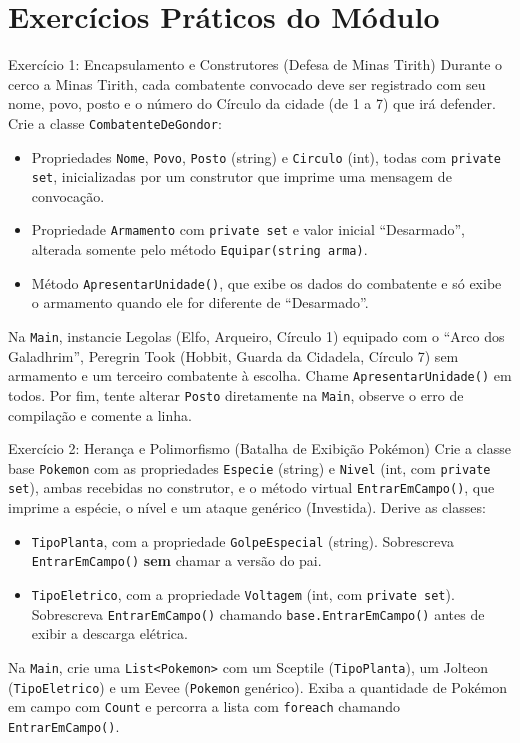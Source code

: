 \section{Exercícios Práticos do Módulo}

\begin{exercicio}{Exercício 1: Encapsulamento e Construtores (Defesa de Minas Tirith)}
Durante o cerco a Minas Tirith, cada combatente convocado deve ser registrado com seu nome,
povo, posto e o número do Círculo da cidade (de 1 a 7) que irá defender. Crie a classe
\texttt{CombatenteDeGondor}:
\begin{itemize}
    \item Propriedades \texttt{Nome}, \texttt{Povo}, \texttt{Posto} (string) e
    \texttt{Circulo} (int), todas com \texttt{private set}, inicializadas por um construtor
    que imprime uma mensagem de convocação.
    \item Propriedade \texttt{Armamento} com \texttt{private set} e valor inicial
    ``Desarmado'', alterada somente pelo método \texttt{Equipar(string arma)}.
    \item Método \texttt{ApresentarUnidade()}, que exibe os dados do combatente e só exibe o
    armamento quando ele for diferente de ``Desarmado''.
\end{itemize}
Na \texttt{Main}, instancie Legolas (Elfo, Arqueiro, Círculo 1) equipado com o ``Arco dos
Galadhrim'', Peregrin Took (Hobbit, Guarda da Cidadela, Círculo 7) sem armamento e um terceiro
combatente à escolha. Chame \texttt{ApresentarUnidade()} em todos. Por fim, tente alterar
\texttt{Posto} diretamente na \texttt{Main}, observe o erro de compilação e comente a linha.
\end{exercicio}

\begin{exercicio}{Exercício 2: Herança e Polimorfismo (Batalha de Exibição Pokémon)}
Crie a classe base \texttt{Pokemon} com as propriedades \texttt{Especie} (string) e
\texttt{Nivel} (int, com \texttt{private set}), ambas recebidas no construtor, e o método
virtual \texttt{EntrarEmCampo()}, que imprime a espécie, o nível e um ataque genérico
(Investida). Derive as classes:
\begin{itemize}
    \item \texttt{TipoPlanta}, com a propriedade \texttt{GolpeEspecial} (string). Sobrescreva
    \texttt{EntrarEmCampo()} \textbf{sem} chamar a versão do pai.
    \item \texttt{TipoEletrico}, com a propriedade \texttt{Voltagem} (int, com
    \texttt{private set}). Sobrescreva \texttt{EntrarEmCampo()} chamando
    \texttt{base.EntrarEmCampo()} antes de exibir a descarga elétrica.
\end{itemize}
Na \texttt{Main}, crie uma \texttt{List<Pokemon>} com um Sceptile (\texttt{TipoPlanta}), um
Jolteon (\texttt{TipoEletrico}) e um Eevee (\texttt{Pokemon} genérico). Exiba a quantidade de
Pokémon em campo com \texttt{Count} e percorra a lista com \texttt{foreach} chamando
\texttt{EntrarEmCampo()}.
\end{exercicio}

